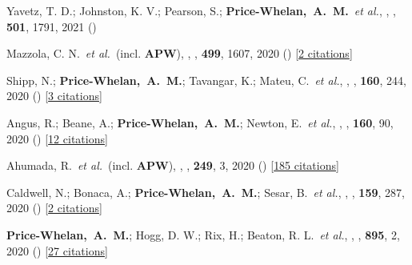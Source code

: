\item[{\color{deemph}\scriptsize70}]Yavetz, T. D.; Johnston, K. V.; Pearson, S.; \textbf{Price-Whelan,~A.~M.}~\textit{et al.}, , \mnras, \textbf{501}, 1791, 2021 ()

\item[{\color{deemph}\scriptsize69}]Mazzola, C. N.~\textit{et al.}~(incl. \textbf{APW}), , \mnras, \textbf{499}, 1607, 2020 () [\href{http://adsabs.harvard.edu/abs/2020MNRAS.499.1607M}{2 citations}]

\item[{\color{deemph}\scriptsize68}]Shipp, N.; \textbf{Price-Whelan,~A.~M.}; Tavangar, K.; Mateu, C.~\textit{et al.}, , \aj, \textbf{160}, 244, 2020 () [\href{http://adsabs.harvard.edu/abs/2020AJ....160..244S}{3 citations}]

\item[{\color{deemph}\scriptsize67}]Angus, R.; Beane, A.; \textbf{Price-Whelan,~A.~M.}; Newton, E.~\textit{et al.}, , \aj, \textbf{160}, 90, 2020 () [\href{http://adsabs.harvard.edu/abs/2020AJ....160...90A}{12 citations}]

\item[{\color{deemph}\scriptsize66}]Ahumada, R.~\textit{et al.}~(incl. \textbf{APW}), , \apjs, \textbf{249}, 3, 2020 () [\href{http://adsabs.harvard.edu/abs/2020ApJS..249....3A}{185 citations}]

\item[{\color{deemph}\scriptsize65}]Caldwell, N.; Bonaca, A.; \textbf{Price-Whelan,~A.~M.}; Sesar, B.~\textit{et al.}, , \aj, \textbf{159}, 287, 2020 () [\href{http://adsabs.harvard.edu/abs/2020AJ....159..287C}{2 citations}]

\item[{\color{deemph}\scriptsize64}]\textbf{Price-Whelan,~A.~M.}; Hogg, D. W.; Rix, H.; Beaton, R. L.~\textit{et al.}, , \apj, \textbf{895}, 2, 2020 () [\href{http://adsabs.harvard.edu/abs/2020ApJ...895....2P}{27 citations}]

